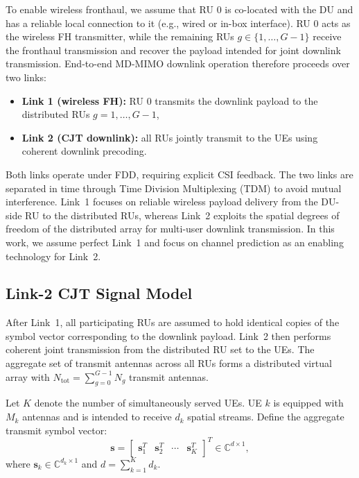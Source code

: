 \documentclass[lettersize,journal]{IEEEtran}
\begin{document}
To enable wireless fronthaul, we assume that RU $0$ is co-located with the DU and has a reliable local connection to it (e.g., wired or in-box interface). RU $0$ acts as the wireless FH transmitter, while the remaining RUs $g\in\{1,\dots,G-1\}$ receive the fronthaul transmission and recover the payload intended for joint downlink transmission. End-to-end MD-MIMO downlink operation therefore proceeds over two links:
\begin{itemize}
    \item \textbf{Link 1 (wireless FH):} RU $0$ transmits the downlink payload to the distributed RUs $g=1,\dots,G-1$,
    \item \textbf{Link 2 (CJT downlink):} all RUs jointly transmit to the UEs using coherent downlink precoding.
\end{itemize}

Both links operate under FDD, requiring explicit CSI feedback. The two links are separated in time through Time Division Multiplexing (TDM) to avoid mutual interference. 
Link~1 focuses on reliable wireless payload delivery from the DU-side RU to the distributed RUs, whereas Link~2 exploits the spatial degrees of freedom of the distributed array for multi-user downlink transmission.
In this work, we assume perfect Link~1 and focus on channel prediction as an enabling technology for Link~2.

\subsection{Link-2 CJT Signal Model}

After Link~1, all participating RUs are assumed to hold identical copies of the symbol vector corresponding to the downlink payload. Link~2 then performs coherent joint transmission from the distributed RU set to the UEs. The aggregate set of transmit antennas across all RUs forms a distributed virtual array with $N_{\mathrm{tot}} = \sum_{g=0}^{G-1} N_g$ transmit antennas.

Let $K$ denote the number of simultaneously served UEs. UE $k$ is equipped with $M_k$ antennas and is intended to receive $d_k$ spatial streams. Define the aggregate transmit symbol vector:
\begin{equation}
\mathbf{s}
=
\begin{bmatrix}
\mathbf{s}_1^T & \mathbf{s}_2^T & \cdots & \mathbf{s}_K^T
\end{bmatrix}^T
\in \mathbb{C}^{d\times 1},
\end{equation}
where $\mathbf{s}_k \in \mathbb{C}^{d_k\times 1}$ and $d = \sum_{k=1}^{K} d_k.$
\end{document}
